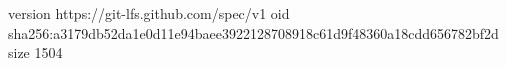 version https://git-lfs.github.com/spec/v1
oid sha256:a3179db52da1e0d11e94baee3922128708918c61d9f48360a18cdd656782bf2d
size 1504
